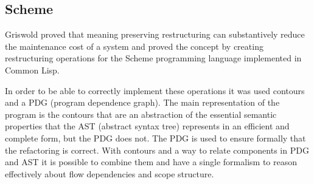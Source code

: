 
\subsection{Scheme}

Griswold \cite{griswold1991program} proved that meaning preserving restructuring can substantively reduce the maintenance cost of a system and proved the concept by creating restructuring operations for the Scheme programming language implemented in Common Lisp.





In order to be able to correctly implement these operations it was used contours and a PDG (program dependence graph). 
The main representation of the program is the contours that are an abstraction of the essential semantic properties that the AST (abstract syntax tree) represents in an efficient and complete form, but the PDG does not.
The PDG is used to ensure formally that the refactoring is correct.
With contours and a way to relate components in PDG and  AST it is possible to combine them and have a single formalism to reason effectively about flow dependencies and scope structure.

